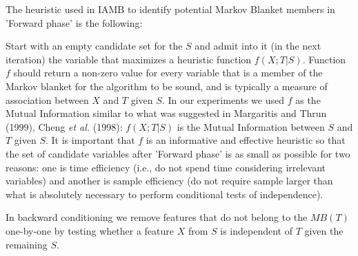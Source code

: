 The heuristic used in IAMB to identify potential Markov Blanket members in 'Forward phase' is the following:

Start with an empty candidate set for the $S$ and admit into it (in the next iteration) the variable that maximizes a heuristic function $f(X ; T | S)$. Function $f$ should return a non-zero value for every variable that is a member of the Markov blanket for the algorithm to be sound, and is typically a measure of association between $X$ and $T$ given $S$. In our experiments we used $f$ as the Mutual Information similar to what was suggested in Margaritis and Thrun (1999), Cheng \emph{et al.} (1998): $f(X ; T | S)$ is the Mutual Information between $S$ and $T$ given $S$. It is important that $f$ is an informative and effective heuristic so that the set of candidate variables after 'Forward phase' is as small as possible for two reasons: one is time efficiency (i.e., do not spend time considering irrelevant variables) and another is sample efficiency (do not require sample larger than what is absolutely necessary to perform conditional tests of independence).

In backward conditioning we remove features that do not belong to the $MB(T)$ one-by-one by testing whether a feature $X$ from $S$ is independent of $T$ given the remaining $S$.